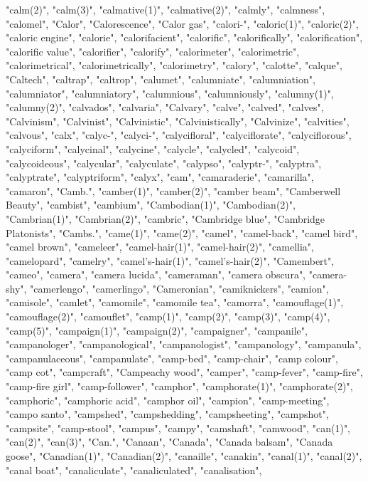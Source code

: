 "calm(2)",
"calm(3)",
"calmative(1)",
"calmative(2)",
"calmly",
"calmness",
"calomel",
"Calor",
"Calorescence",
"Calor gas",
"calori-",
"caloric(1)",
"caloric(2)",
"caloric engine",
"calorie",
"calorifacient",
"calorific",
"calorifically",
"calorification",
"calorific value",
"calorifier",
"calorify",
"calorimeter",
"calorimetric",
"calorimetrical",
"calorimetrically",
"calorimetry",
"calory",
"calotte",
"calque",
"Caltech",
"caltrap",
"caltrop",
"calumet",
"calumniate",
"calumniation",
"calumniator",
"calumniatory",
"calumnious",
"calumniously",
"calumny(1)",
"calumny(2)",
"calvados",
"calvaria",
"Calvary",
"calve",
"calved",
"calves",
"Calvinism",
"Calvinist",
"Calvinistic",
"Calvinistically",
"Calvinize",
"calvities",
"calvous",
"calx",
"calyc-",
"calyci-",
"calycifloral",
"calyciflorate",
"calyciflorous",
"calyciform",
"calycinal",
"calycine",
"calycle",
"calycled",
"calycoid",
"calycoideous",
"calycular",
"calyculate",
"calypso",
"calyptr-",
"calyptra",
"calyptrate",
"calyptriform",
"calyx",
"cam",
"camaraderie",
"camarilla",
"camaron",
"Camb.",
"camber(1)",
"camber(2)",
"camber beam",
"Camberwell Beauty",
"cambist",
"cambium",
"Cambodian(1)",
"Cambodian(2)",
"Cambrian(1)",
"Cambrian(2)",
"cambric",
"Cambridge blue",
"Cambridge Platonists",
"Cambs.",
"came(1)",
"came(2)",
"camel",
"camel-back",
"camel bird",
"camel brown",
"cameleer",
"camel-hair(1)",
"camel-hair(2)",
"camellia",
"camelopard",
"camelry",
"camel's-hair(1)",
"camel's-hair(2)",
"Camembert",
"cameo",
"camera",
"camera lucida",
"cameraman",
"camera obscura",
"camera-shy",
"camerlengo",
"camerlingo",
"Cameronian",
"camiknickers",
"camion",
"camisole",
"camlet",
"camomile",
"camomile tea",
"camorra",
"camouflage(1)",
"camouflage(2)",
"camouflet",
"camp(1)",
"camp(2)",
"camp(3)",
"camp(4)",
"camp(5)",
"campaign(1)",
"campaign(2)",
"campaigner",
"campanile",
"campanologer",
"campanological",
"campanologist",
"campanology",
"campanula",
"campanulaceous",
"campanulate",
"camp-bed",
"camp-chair",
"camp colour",
"camp cot",
"campcraft",
"Campeachy wood",
"camper",
"camp-fever",
"camp-fire",
"camp-fire girl",
"camp-follower",
"camphor",
"camphorate(1)",
"camphorate(2)",
"camphoric",
"camphoric acid",
"camphor oil",
"campion",
"camp-meeting",
"campo santo",
"campshed",
"campshedding",
"campsheeting",
"campshot",
"campsite",
"camp-stool",
"campus",
"campy",
"camshaft",
"camwood",
"can(1)",
"can(2)",
"can(3)",
"Can.",
"Canaan",
"Canada",
"Canada balsam",
"Canada goose",
"Canadian(1)",
"Canadian(2)",
"canaille",
"canakin",
"canal(1)",
"canal(2)",
"canal boat",
"canaliculate",
"canaliculated",
"canalisation",
